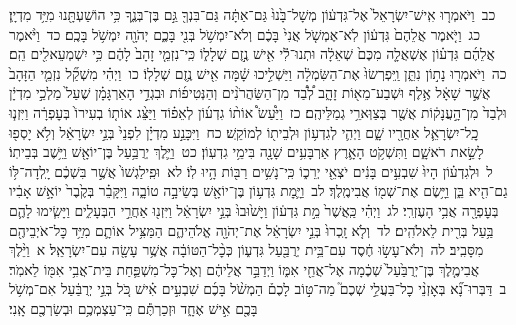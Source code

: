 \documentclass[18pt]{article}
\begin{document}
 {\loc כב~}וַיֹּאמְר֤וּ אִֽישׁ־יִשְׂרָאֵל֙ אֶל־גִּדְע֔וֹן מְשָׁל־בָּ֙נוּ֙ גַּם־אַתָּ֔ה גַּם־בִּנְךָ֖ גַּ֣ם בֶּן־בְּנֶ֑ךָ כִּ֥י הוֹשַׁעְתָּ֖נוּ מִיַּ֥ד מִדְיָֽן׃ \startlock
 {\loc כג~}וַיֹּ֤אמֶר אֲלֵהֶם֙ גִּדְע֔וֹן לֹֽא־אֶמְשֹׁ֤ל אֲנִי֙ בָּכֶ֔ם וְלֹא־יִמְשֹׁ֥ל בְּנִ֖י בָּכֶ֑ם יְהֹוָ֖ה יִמְשֹׁ֥ל בָּכֶֽם׃ \startlock
 {\loc כד~}וַיֹּ֨אמֶר אֲלֵהֶ֜ם גִּדְע֗וֹן אֶשְׁאֲלָ֤ה מִכֶּם֙ שְׁאֵלָ֔ה וּתְנוּ־לִ֕י אִ֖ישׁ נֶ֣זֶם שְׁלָל֑וֹ כִּֽי־נִזְמֵ֤י זָהָב֙ לָהֶ֔ם כִּ֥י יִשְׁמְעֵאלִ֖ים הֵֽם׃ \startlock
 {\loc כה~}וַיֹּאמְר֖וּ נָת֣וֹן נִתֵּ֑ן וַֽיִּפְרְשׂוּ֙ אֶת־הַשִּׂמְלָ֔ה וַיַּשְׁלִ֣יכוּ שָׁ֔מָּה אִ֖ישׁ נֶ֥זֶם שְׁלָלֽוֹ׃ \startlock
 {\loc כו~}וַיְהִ֗י מִשְׁקַ֞ל נִזְמֵ֤י הַזָּהָב֙ אֲשֶׁ֣ר שָׁאָ֔ל אֶ֥לֶף וּשְׁבַע־מֵא֖וֹת זָהָ֑ב לְ֠בַ֠ד מִן־הַשַּׂהֲרֹנִ֨ים וְהַנְּטִיפ֜וֹת וּבִגְדֵ֣י הָאַרְגָּמָ֗ן שֶׁעַל֙ מַלְכֵ֣י מִדְיָ֔ן וּלְבַד֙ מִן־הָ֣עֲנָק֔וֹת אֲשֶׁ֖ר בְּצַוְּארֵ֥י גְמַלֵּיהֶֽם׃ \startlock
 {\loc כז~}וַיַּ֩עַשׂ֩ אוֹת֨וֹ גִדְע֜וֹן לְאֵפ֗וֹד וַיַּצֵּ֨ג אוֹת֤וֹ בְעִירוֹ֙ בְּעׇפְרָ֔ה וַיִּזְנ֧וּ כׇֽל־יִשְׂרָאֵ֛ל אַחֲרָ֖יו שָׁ֑ם וַיְהִ֛י לְגִדְע֥וֹן וּלְבֵית֖וֹ לְמוֹקֵֽשׁ׃ \startlock
 {\loc כח~}וַיִּכָּנַ֣ע מִדְיָ֗ן לִפְנֵי֙ בְּנֵ֣י יִשְׂרָאֵ֔ל וְלֹ֥א יָסְפ֖וּ לָשֵׂ֣את רֹאשָׁ֑ם וַתִּשְׁקֹ֥ט הָאָ֛רֶץ אַרְבָּעִ֥ים שָׁנָ֖ה בִּימֵ֥י גִדְעֽוֹן׃ \startlock
 {\loc כט~}וַיֵּ֛לֶךְ יְרֻבַּ֥עַל בֶּן־יוֹאָ֖שׁ וַיֵּ֥שֶׁב בְּבֵיתֽוֹ׃ \startlock
 {\loc ל~}וּלְגִדְע֗וֹן הָיוּ֙ שִׁבְעִ֣ים בָּנִ֔ים יֹצְאֵ֖י יְרֵכ֑וֹ כִּֽי־נָשִׁ֥ים רַבּ֖וֹת הָ֥יוּ לֽוֹ׃ \startlock
 {\loc לא~}וּפִֽילַגְשׁוֹ֙ אֲשֶׁ֣ר בִּשְׁכֶ֔ם יָֽלְדָה־לּ֥וֹ גַם־הִ֖יא בֵּ֑ן וַיָּ֥שֶׂם אֶת־שְׁמ֖וֹ אֲבִימֶֽלֶךְ׃ \startlock
 {\loc לב~}וַיָּ֛מׇת גִּדְע֥וֹן בֶּן־יוֹאָ֖שׁ בְּשֵׂיבָ֣ה טוֹבָ֑ה וַיִּקָּבֵ֗ר בְּקֶ֙בֶר֙ יוֹאָ֣שׁ אָבִ֔יו בְּעׇפְרָ֖ה אֲבִ֥י הָעֶזְרִֽי׃ \startlock
 {\loc לג~}וַיְהִ֗י כַּֽאֲשֶׁר֙ מֵ֣ת גִּדְע֔וֹן וַיָּשׁ֙וּבוּ֙ בְּנֵ֣י יִשְׂרָאֵ֔ל וַיִּזְנ֖וּ אַחֲרֵ֣י הַבְּעָלִ֑ים וַיָּשִׂ֧ימוּ לָהֶ֛ם בַּ֥עַל בְּרִ֖ית לֵאלֹהִֽים׃ \startlock
 {\loc לד~}וְלֹ֤א זָֽכְרוּ֙ בְּנֵ֣י יִשְׂרָאֵ֔ל אֶת־יְהֹוָ֖ה אֱלֹהֵיהֶ֑ם הַמַּצִּ֥יל אוֹתָ֛ם מִיַּ֥ד כׇּל־אֹיְבֵיהֶ֖ם מִסָּבִֽיב׃ \startlock
 {\loc לה~}וְלֹא־עָשׂ֣וּ חֶ֔סֶד עִם־בֵּ֥ית יְרֻבַּ֖עַל גִּדְע֑וֹן כְּכׇ֨ל־הַטּוֹבָ֔ה אֲשֶׁ֥ר עָשָׂ֖ה עִם־יִשְׂרָאֵֽל׃ 
\startlock
 {\loc א~}וַיֵּ֨לֶךְ אֲבִימֶ֤לֶךְ בֶּן־יְרֻבַּ֙עַל֙ שְׁכֶ֔מָה אֶל־אֲחֵ֖י אִמּ֑וֹ וַיְדַבֵּ֣ר אֲלֵיהֶ֔ם וְאֶל־כׇּל־מִשְׁפַּ֛חַת בֵּית־אֲבִ֥י אִמּ֖וֹ לֵאמֹֽר׃ \startlock
 {\loc ב~}דַּבְּרוּ־נָ֞א בְּאׇזְנֵ֨י כׇל־בַּעֲלֵ֣י שְׁכֶם֮ מַה־טּ֣וֹב לָכֶם֒ הַמְשֹׁ֨ל בָּכֶ֜ם שִׁבְעִ֣ים אִ֗ישׁ כֹּ֚ל בְּנֵ֣י יְרֻבַּ֔עַל אִם־מְשֹׁ֥ל בָּכֶ֖ם אִ֣ישׁ אֶחָ֑ד וּזְכַרְתֶּ֕ם כִּֽי־עַצְמְכֶ֥ם וּבְשַׂרְכֶ֖ם אָֽנִי׃ \startlock
\end{document}

